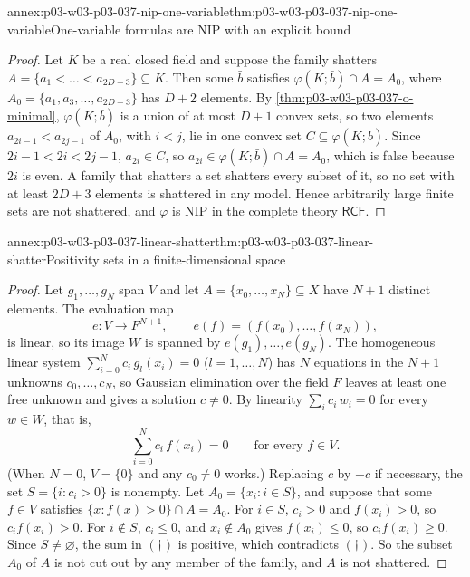 \begin{annexitem}{annex:p03-w03-p03-037-nip-one-variable}{thm:p03-w03-p03-037-nip-one-variable}{One-variable formulas are NIP with an explicit bound}
\begin{proof}
Let \(K\) be a real closed field and suppose the family shatters
\(A=\{a_1<\dots<a_{2D+3}\}\subseteq K\).  Then some \(\bar b\) satisfies
\(\varphi(K;\bar b)\cap A=A_0\), where \(A_0=\{a_1,a_3,\dots,a_{2D+3}\}\)
has \(D+2\) elements.  By \cref{thm:p03-w03-p03-037-o-minimal},
\(\varphi(K;\bar b)\) is a union of at most \(D+1\) convex sets, so two
elements \(a_{2i-1}<a_{2j-1}\) of \(A_0\), with \(i<j\), lie in one convex
set \(C\subseteq\varphi(K;\bar b)\).  Since \(2i-1<2i<2j-1\),
\(a_{2i}\in C\), so \(a_{2i}\in\varphi(K;\bar b)\cap A=A_0\), which is false
because \(2i\) is even.  A family that shatters a set shatters every subset
of it, so no set with at least \(2D+3\) elements is shattered in any model.
Hence arbitrarily large finite sets are not shattered, and \(\varphi\) is
NIP in the complete theory \(\mathsf{RCF}\).
\end{proof}
\end{annexitem}

\begin{annexitem}{annex:p03-w03-p03-037-linear-shatter}{thm:p03-w03-p03-037-linear-shatter}{Positivity sets in a finite-dimensional space}
\begin{proof}
Let \(g_1,\dots,g_N\) span \(V\) and let \(A=\{x_0,\dots,x_N\}\subseteq X\)
have \(N+1\) distinct elements.  The evaluation map
\[
e:V\to F^{N+1},\qquad e(f)=(f(x_0),\dots,f(x_N)),
\]
is linear, so its image
\(W\) is spanned by \(e(g_1),\dots,e(g_N)\).  The homogeneous linear system
\(\sum_{i=0}^{N}c_i\,g_l(x_i)=0\) (\(l=1,\dots,N\)) has \(N\) equations in the
\(N+1\) unknowns \(c_0,\dots,c_N\), so Gaussian elimination over the field
\(F\) leaves at least one free unknown and gives a solution
\(c\neq0\).  By linearity \(\sum_ic_i\,w_i=0\) for every \(w\in W\), that is,
\[
\sum_{i=0}^{N}c_i\,f(x_i)=0\qquad\text{for every }f\in V.\tag{\(\dagger\)}
\]
(When \(N=0\), \(V=\{0\}\) and any \(c_0\neq0\) works.)  Replacing \(c\) by
\(-c\) if necessary, the set \(S=\{i:c_i>0\}\) is nonempty.  Let
\(A_0=\{x_i:i\in S\}\), and suppose that some \(f\in V\) satisfies
\(\{x:f(x)>0\}\cap A=A_0\).  For \(i\in S\), \(c_i>0\) and \(f(x_i)>0\), so
\(c_if(x_i)>0\).  For \(i\notin S\), \(c_i\leq0\), and \(x_i\notin A_0\)
gives \(f(x_i)\leq0\), so \(c_if(x_i)\geq0\).  Since \(S\neq\varnothing\), the
sum in \((\dagger)\) is positive, which contradicts \((\dagger)\).  So the
subset \(A_0\) of \(A\) is not cut out by any member of the family, and \(A\)
is not shattered.
\end{proof}
\end{annexitem}

